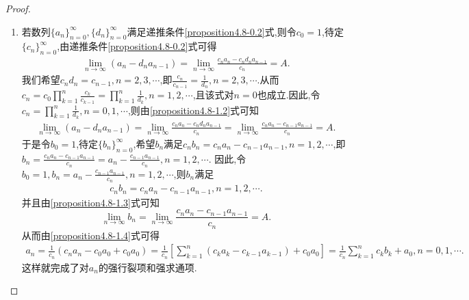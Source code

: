 \documentclass[../../main.tex]{subfiles}%
\begin{document}
\begin{proof}
\begin{enumerate}[(1)]
\item 若数列\(\{ a_n \}_{n = 0}^{\infty}, \{ d_n \}_{n = 0}^{\infty}\)满足递推条件\eqref{proposition4.8-0.2}式,则令\(c_0 = 1\),待定\(\{ c_n \}_{n = 0}^{\infty}\),由递推条件\eqref{proposition4.8-0.2}式可得
\begin{align}\label{proposition4.8-1.2}
\lim_{n\rightarrow \infty}(a_n - d_na_{n - 1}) = \lim_{n\rightarrow \infty}\frac{c_na_n - c_nd_na_{n - 1}}{c_n} = A. 
\end{align}
我们希望\(c_nd_n = c_{n - 1}, n = 2, 3, \cdots\),即\(\frac{c_n}{c_{n - 1}} = \frac{1}{d_n}, n = 2, 3, \cdots\).从而\(c_n = c_0\prod_{k = 1}^n{\frac{c_k}{c_{k - 1}}} = \prod_{k = 1}^n{\frac{1}{d_k}}, n = 1, 2, \cdots\),且该式对\(n = 0\)也成立.因此,令\(c_n = \prod_{k = 1}^n{\frac{1}{d_k}}, n = 0, 1, \cdots\),则由\eqref{proposition4.8-1.2}式可知
\begin{align}\label{proposition4.8-1.3}
\lim_{n\rightarrow \infty}(a_n - d_na_{n - 1}) = \lim_{n\rightarrow \infty}\frac{c_na_n - c_nd_na_{n - 1}}{c_n} = \lim_{n\rightarrow \infty}\frac{c_na_n - c_{n - 1}a_{n - 1}}{c_n} = A.
\end{align}
于是令\(b_0 = 1\),待定\(\{ b_n \}_{n = 0}^{\infty}\),希望\(b_n\)满足\(c_nb_n = c_na_n - c_{n - 1}a_{n - 1}, n = 1, 2, \cdots\),即\(b_n = \frac{c_na_n - c_{n - 1}a_{n - 1}}{c_n} = a_n - \frac{c_{n - 1}a_{n - 1}}{c_n}, n = 1, 2, \cdots\).
因此,令\(b_0 = 1, b_n = a_n - \frac{c_{n - 1}a_{n - 1}}{c_n}, n = 1, 2, \cdots\),则\(b_n\)满足
\begin{align}\label{proposition4.8-1.4}
c_nb_n = c_na_n - c_{n - 1}a_{n - 1}, n = 1, 2, \cdots.
\end{align}
并且由\eqref{proposition4.8-1.3}式可知
\[
\lim_{n\rightarrow \infty}b_n = \lim_{n\rightarrow \infty}\frac{c_na_n - c_{n - 1}a_{n - 1}}{c_n} = A.
\]
从而由\eqref{proposition4.8-1.4}式可得
\begin{align*}
a_n = \frac{1}{c_n}(c_na_n - c_0a_0 + c_0a_0)
= \frac{1}{c_n}\left[ \sum_{k = 1}^n{(c_ka_k - c_{k - 1}a_{k - 1})} + c_0a_0 \right]
= \frac{1}{c_n}\sum_{k = 1}^n{c_kb_k} + a_0, n = 0, 1, \cdots.
\end{align*}
这样就完成了对\(a_n\)的强行裂项和强求通项.
\end{enumerate}
\end{proof}
\end{document}
